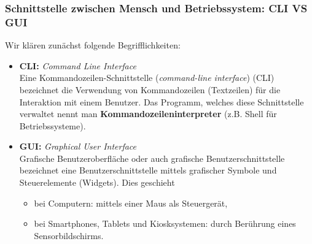 




\subsubsection{Schnittstelle zwischen Mensch und Betriebssystem: CLI VS GUI}
Wir klären zunächst folgende Begrifflichkeiten:
\begin{itemize}
	\item \textbf{CLI:} \textit{Command Line Interface} \\
Eine Kommandozeilen-Schnittstelle (\textit{command-line interface}) (CLI)  bezeichnet die Verwendung von Kommandozeilen (Textzeilen) für die Interaktion mit einem Benutzer. Das Programm, welches diese Schnittstelle verwaltet nennt man \textbf{Kommandozeileninterpreter} (z.B. Shell für Betriebssysteme).
%
\item \textbf{GUI:} \textit{Graphical User Interface}\\
Grafische Benutzeroberfläche oder auch grafische Benutzerschnittstelle bezeichnet eine Benutzerschnittstelle mittels grafischer Symbole und Steuerelemente (Widgets). Dies geschieht
\begin{itemize}
	\item bei Computern: mittels einer Maus als Steuergerät,
	\item bei Smartphones, Tablets und Kiosksystemen:  durch Berührung eines Sensorbildschirms.
\end{itemize}
\end{itemize}

